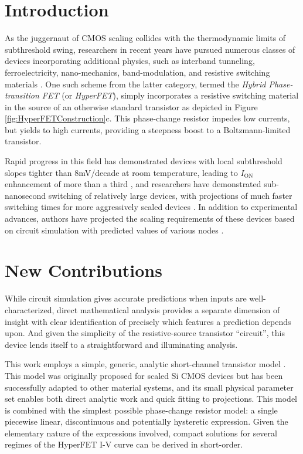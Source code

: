 \ifdoublecol\begin{multicols}{2}\fi

\section*{Introduction}
As the juggernaut of CMOS scaling collides with the thermodynamic limits of subthreshold swing, researchers in recent years have pursued numerous classes of devices incorporating additional physics, such as interband tunneling, ferroelectricity, nano-mechanics, band-modulation, and resistive switching materials \cite{Cristoloveanu_2016}.  One such scheme from the latter category, termed the \textit{Hybrid Phase-transition FET} (or \textit{HyperFET}), simply incorporates a resistive switching material in the source of an otherwise standard transistor \cite{Shukla_2015} as depicted in Figure \ref{fig:HyperFETConstruction}c.  This phase-change resistor impedes low currents, but yields to high currents, providing a steepness boost to a Boltzmann-limited transistor.

Rapid progress in this field has demonstrated devices with local subthreshold slopes tighter than 8mV/decade at room temperature, leading to $I_\mathrm{ON}$ enhancement of more than a third \cite{Frougier_2016}, and researchers have demonstrated sub-nanosecond switching \cite{Frougier_2016,Jerry_2016} of relatively large devices, with projections of much faster switching times for more aggressively scaled devices \cite{Jerry_2016}.  In addition to experimental advances, authors have projected the scaling requirements of these devices based on circuit simulation with predicted values of various nodes \cite{Shukla_2015,Frougier_2016}. 

\section*{New Contributions}
While circuit simulation gives accurate predictions when inputs are well-characterized, direct mathematical analysis provides a separate dimension of insight with clear identification of precisely which features a prediction depends upon. And given the simplicity of the resistive-source transistor ``circuit'', this device lends itself to a straightforward and illuminating analysis.

This work employs a simple, generic, analytic short-channel transistor model \cite{Khakifirooz_2009}.  This model was originally proposed for scaled Si CMOS devices but has been successfully adapted to other material systems, and its small physical parameter set enables both direct analytic work and quick fitting to projections.  This model is combined with the simplest possible phase-change resistor model: a single piecewise linear, discontinuous and potentially hysteretic expression.  Given the elementary nature of the expressions involved, compact solutions for several regimes of the HyperFET I-V curve can be derived in short-order.


\end{multicols}

